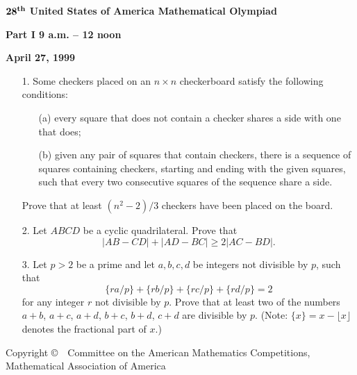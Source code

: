 \documentclass[12pt]{article}
\begin{document}
%

\begin{center}
${\bf 28^{th}}$ {\bf United States of America Mathematical Olympiad}
\end{center}

\begin{center}
{\bf  Part  I \hspace{ 6mm} 9 a.m. -- 12 noon}
\end{center}

\begin{center}
{\bf April 27, 1999}
\end{center}

\bigskip
\begin{itemize}

\item[1.]
Some checkers placed on an $n \times n$ checkerboard satisfy the following
conditions:
\begin{enumerate}
\item[(a)] every square that does not contain a checker shares a side
with one that does;
\item[(b)] given any pair of squares that contain checkers, there is
a sequence of squares containing checkers, starting and ending with
the given squares, such that every two consecutive squares of the
sequence share a side.
\end{enumerate}
Prove that at least $(n^{2}-2)/3$ checkers have been placed on the
board.

\item[2.]
Let $ABCD$ be a cyclic quadrilateral. Prove that
\[
|AB - CD| + |AD - BC| \geq 2|AC - BD|.
\]

\item[3.]
Let $p > 2$ be a prime and let $a,b,c,d$ be integers not divisible
by $p$, such that
\[
\{ra/p\} + \{rb/p\} + \{rc/p\} + \{rd/p\} = 2
\]
for any integer $r$ not divisible by $p$.
Prove that at least two of the numbers $a+b$, $a+c$, $a+d$, $b+c$, $b+d$, $c+d$
are divisible by $p$.
(Note: $\{x\} = x - \lfloor x \rfloor$ denotes the fractional part of $x$.)

\end{itemize}

\vfill

{\small
\begin{center}
Copyright \copyright \ \ Committee on the American  Mathematics
Competitions,\\
Mathematical Association of America
\end{center}
}
\end{document}
